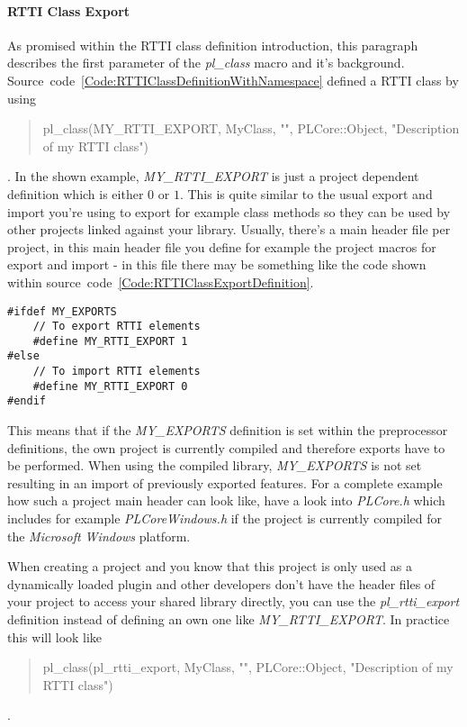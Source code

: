 \paragraph{RTTI Class Export}
As promised within the RTTI class definition introduction, this paragraph describes the first parameter of the \emph{pl\_class} macro and it's background. Source~code~\ref{Code:RTTIClassDefinitionWithNamespace} defined a RTTI class by using \begin{quote}pl\_class(MY\_RTTI\_EXPORT, MyClass, "", PLCore::Object, "Description of my RTTI class")\end{quote}. In the shown example, \emph{MY\_RTTI\_EXPORT} is just a project dependent definition which is either $0$ or $1$. This is quite similar to the usual export and import you're using to export for example class methods so they can be used by other projects linked against your library. Usually, there's a main header file per project, in this main header file you define for example the project macros for export and import - in this file there may be something like the code shown within source~code~\ref{Code:RTTIClassExportDefinition}.
\begin{lstlisting}[float=htb,label=Code:RTTIClassExportDefinition,caption={RTTI class export definition}]
#ifdef MY_EXPORTS
	// To export RTTI elements
	#define MY_RTTI_EXPORT 1
#else
	// To import RTTI elements
	#define MY_RTTI_EXPORT 0
#endif
\end{lstlisting}
This means that if the \emph{MY\_EXPORTS} definition is set within the preprocessor definitions, the own project is currently compiled and therefore exports have to be performed. When using the compiled library, \emph{MY\_EXPORTS} is not set resulting in an import of previously exported features. For a complete example how such a project main header can look like, have a look into \emph{PLCore.h} which includes for example \emph{PLCoreWindows.h} if the project is currently compiled for the \emph{Microsoft Windows} platform.

When creating a project and you know that this project is only used as a dynamically loaded plugin and other developers don't have the header files of your project to access your shared library directly, you can use the \emph{pl\_rtti\_export} definition instead of defining an own one like \emph{MY\_RTTI\_EXPORT}. In practice this will look like \begin{quote}pl\_class(pl\_rtti\_export, MyClass, "", PLCore::Object, "Description of my RTTI class")\end{quote}.


